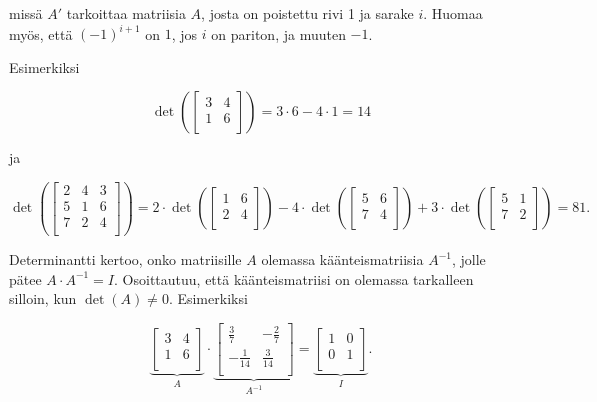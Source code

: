 missä $A'$ tarkoittaa matriisia $A$,
josta on poistettu rivi 1 ja sarake $i$.
Huomaa myös, että $(-1)^{i+1}$ on $1$,
jos $i$ on pariton, ja muuten $-1$.

Esimerkiksi

\[
\det(
 \begin{bmatrix}
  3 & 4 \\
  1 & 6 \\
 \end{bmatrix}
) = 3 \cdot 6 - 4 \cdot 1 = 14 
\]

ja

\[
\det(
 \begin{bmatrix}
  2 & 4 & 3 \\
  5 & 1 & 6 \\
  7 & 2 & 4 \\
 \end{bmatrix}
) = 
2 \cdot
\det(
 \begin{bmatrix}
  1 & 6 \\
  2 & 4 \\
 \end{bmatrix}
)
-4 \cdot
\det(
 \begin{bmatrix}
  5 & 6 \\
  7 & 4 \\
 \end{bmatrix}
)
+3 \cdot
\det(
 \begin{bmatrix}
  5 & 1 \\
  7 & 2 \\
 \end{bmatrix}
) = 81.
\]

Determinantti kertoo, onko matriisille
$A$ olemassa käänteismatriisia
$A^{-1}$, jolle pätee $A \cdot A^{-1} = I$.
Osoittautuu, että käänteismatriisi on olemassa
tarkalleen silloin, kun $\det(A) \neq 0$.
Esimerkiksi

\[
\underbrace{
 \begin{bmatrix}
  3 & 4 \\
  1 & 6 \\
 \end{bmatrix}
}_{A}
\cdot
\underbrace{
 \begin{bmatrix}
  \frac{3}{7} & -\frac{2}{7} \\
  -\frac{1}{14} & \frac{3}{14} \\
 \end{bmatrix}
}_{A^{-1}}
=
\underbrace{
 \begin{bmatrix}
  1 & 0 \\
  0 & 1 \\
 \end{bmatrix}
}_{I}.
\]

